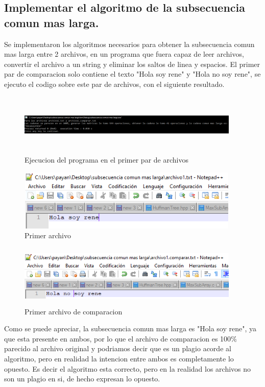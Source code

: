 \documentclass[spanish]{article}
\begin{document}
	\subsection{Implementar el algoritmo de la subsecuencia comun mas larga.}
	Se implementaron los algoritmos necesarios para obtener la subsecuencia comun mas larga entre 2 archivos, en un programa que fuera capaz de leer archivos, convertir el archivo a un string y eliminar los saltos de linea y espacios. El primer par de comparacion solo contiene el texto "Hola soy rene" y "Hola no soy rene", se ejecuto el codigo sobre este par de archivos, con el siguiente resultado.\\
	\begin{figure}[H]
		\centering
		\includegraphics[width=400px,height=110px]{captura1}
		\caption{Ejecucion del programa en el primer par de archivos}
	\end{figure}
	\begin{figure}[H]
		\centering
		\includegraphics[width=400px,height=110px]{captura2}
		\caption{Primer archivo}
	\end{figure}
	\begin{figure}[H]
		\centering
		\includegraphics[width=400px,height=110px]{captura3}
		\caption{Primer archivo de comparacion}
	\end{figure}
	Como se puede apreciar, la subsecuencia comun mas larga es "Hola soy rene", ya que esta presente en ambos, por lo que el archivo de comparacion es 100$\%$ parecido al archivo original y podriamos decir que es un plagio acorde al algoritmo, pero en realidad la intencion entre ambos es completamente lo opuesto. Es decir el algoritmo esta correcto, pero en la realidad los archivos no son un plagio en si, de hecho expresan lo opuesto.\\
\end{document}
